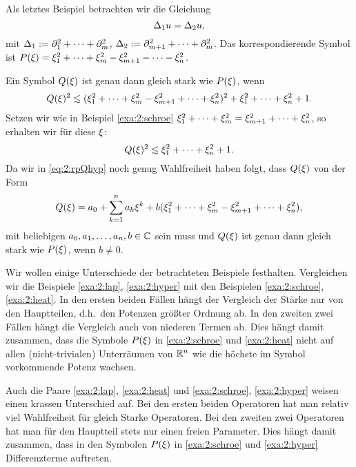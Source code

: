 \begin{exa}\label{exa:2:hyper}
Als letztes Beispiel betrachten wir die Gleichung
\begin{equation}
\Delta_1u=\Delta_2u,
\end{equation}
mit $\Delta_1:=\partial_1^2+\dots+\partial_m^2$, $\Delta_2:=\partial^2_{m+1}+\dots+\partial^2_m$.
Das korrespondierende Symbol ist $P(\xi)=\xi^2_1+\dots+\xi^2_m-\xi^2_{m+1}-\dots-\xi^2_n$.

Ein Symbol $Q(\xi)$ ist genau dann gleich stark wie $P(\xi)$,
wenn
\begin{equation}
Q(\x)^2\apprle(\x^2_1+\dots+\x^2_m-\x^2_{m+1}+\dots+\x^2_n)^2+\x^2_1+\dots+\x^2_n+1.
\end{equation}
Setzen wir wie in Beispiel \ref{exa:2:schroe} $\xi^2_1+\dots+\xi^2_m=\xi^2_{m+1}+\dots+\xi^2_n$,
so erhalten wir für diese $\xi$:
\begin{equation}\label{eq:2:rpQhyp}
Q(\x)^2\apprle\x^2_1+\dots+\x^2_n+1.
\end{equation}
Da wir in \eqref{eq:2:rpQhyp} noch genug Wahlfreiheit haben folgt,
dass $Q(\xi)$ von der Form
\begin{equation}
Q(\xi)=a_0+\sum_{k=1}^na_k\xi^k+b(\xi_1^2+\dots+\xi^2_m-\xi^2_{m+1}+\dots+\xi^2_n),
\end{equation}
mit beliebigen $a_0,a_1,\dots,a_n,b\in\mathbb C$ sein muss
und $Q(\xi)$ ist genau dann gleich stark wie $P(\xi)$,
wenn $b\neq0$.
\end{exa}

Wir wollen einige Unterschiede der betrachteten Beispiele festhalten.
Vergleichen wir die Beispiele \ref{exa:2:lap}, \ref{exa:2:hyper}
mit den Beispielen \ref{exa:2:schroe}, \ref{exa:2:heat}.
In den ersten beiden Fällen hängt der Vergleich der Stärke nur von den Hauptteilen,
d.h.~den Potenzen größter Ordnung ab.
In den zweiten zwei Fällen hängt die Vergleich auch von niederen Termen ab.
Dies hängt damit zusammen, dass die Symbole $P(\xi)$ in
\ref{exa:2:schroe} und \ref{exa:2:heat} nicht auf allen (nicht-trivialen)
Unterräumen von $\mathbb R^n$ wie die höchste im Symbol vorkommende Potenz wachsen.

Auch die Paare \ref{exa:2:lap}, \ref{exa:2:heat}
und \ref{exa:2:schroe}, \ref{exa:2:hyper}
weisen einen krassen Unterschied auf.
Bei den ersten beiden Operatoren hat man relativ viel Wahlfreiheit
für gleich Starke Operatoren.
Bei den zweiten zwei Operatoren hat man für den Hauptteil stets
nur einen freien Parameter.
Dies hängt damit zusammen, dass in den Symbolen $P(\xi)$
in \ref{exa:2:schroe} und \ref{exa:2:hyper} Differenzterme auftreten.

